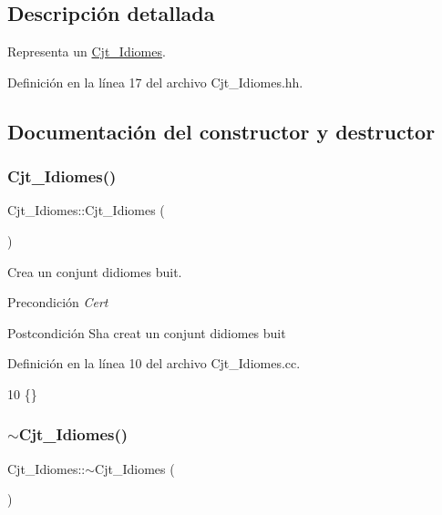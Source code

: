 \subsection{Descripción detallada}
Representa un \hyperlink{class_cjt___idiomes}{Cjt\+\_\+\+Idiomes}. 

Definición en la línea 17 del archivo Cjt\+\_\+\+Idiomes.\+hh.



\subsection{Documentación del constructor y destructor}
\mbox{\label{class_cjt___idiomes_af77cbc534e3e83142a818314f5c24ae3}} 
\subsubsection{\texorpdfstring{Cjt\+\_\+\+Idiomes()}{Cjt\_Idiomes()}}
{\footnotesize\ttfamily Cjt\+\_\+\+Idiomes\+::\+Cjt\+\_\+\+Idiomes (\begin{DoxyParamCaption}{ }\end{DoxyParamCaption})}



Crea un conjunt d\textquotesingle{}idiomes buit. 

\begin{DoxyPrecond}{Precondición}
{\itshape Cert} 
\end{DoxyPrecond}
\begin{DoxyPostcond}{Postcondición}
S\textquotesingle{}ha creat un conjunt d\textquotesingle{}idiomes buit 
\end{DoxyPostcond}


Definición en la línea 10 del archivo Cjt\+\_\+\+Idiomes.\+cc.


\begin{DoxyCode}
10 \{\}
\end{DoxyCode}
\mbox{\label{class_cjt___idiomes_ab36517bd1824e0f00cab6cf724b6ad6f}} 
\subsubsection{\texorpdfstring{$\sim$\+Cjt\+\_\+\+Idiomes()}{~Cjt\_Idiomes()}}
{\footnotesize\ttfamily Cjt\+\_\+\+Idiomes\+::$\sim$\+Cjt\+\_\+\+Idiomes (\begin{DoxyParamCaption}{ }\end{DoxyParamCaption})}



